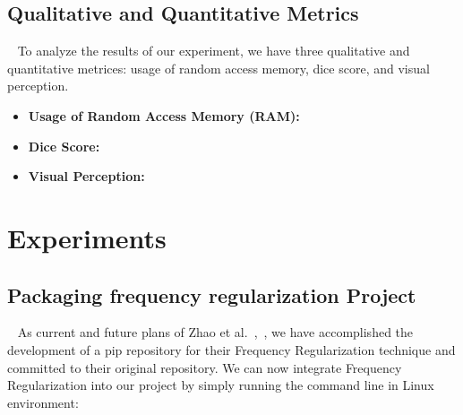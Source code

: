\documentclass[conference]{IEEEtran}
\begin{document}
\subsection{Qualitative and Quantitative Metrics}~\label{metrics}
To analyze the results of our experiment, we have three qualitative and quantitative metrices: usage of random access memory, dice score, and visual perception.
\begin{itemize}
	\item\textbf{Usage of Random Access Memory (RAM): }
	\item\textbf{Dice Score:}
	\item\textbf{Visual Perception:}
\end{itemize}	



\section{Experiments} 
\subsection{Packaging frequency regularization Project}~\label{package_fr}
As current and future plans of Zhao et al.~\cite{fr_repo},~\cite{zhao2023fr}, we have accomplished the development of a pip repository for their Frequency Regularization technique and committed to their original repository. We can now integrate Frequency Regularization into our project by simply running the command line in Linux environment:
\end{document}
